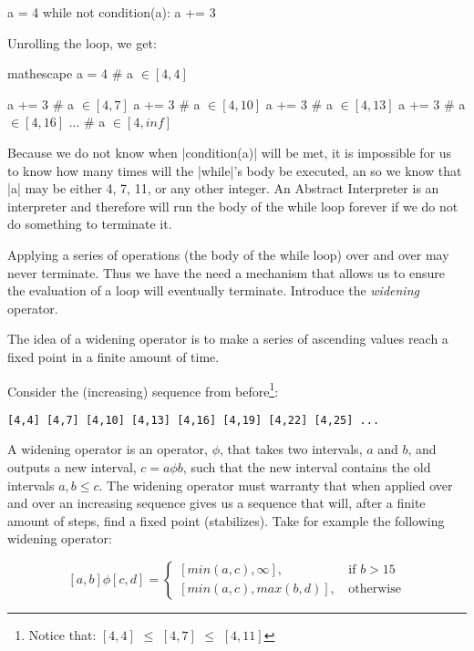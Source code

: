 \begin{pythoncode}
a = 4
while not condition(a):
  a += 3
\end{pythoncode}

Unrolling the loop, we get:

\begin{pythoncode*}{mathescape}
a = 4     # a $\in [4,4]$

  a += 3  # a $\in [4,7]$
  a += 3  # a $\in [4,10]$
  a += 3  # a $\in [4,13]$
  a += 3  # a $\in [4,16]$
  ...
  # a $\in [4, inf]$
\end{pythoncode*}

Because we do not know when \pycode|condition(a)| will be met, it is
impossible for us to know how many times will the \pycode|while|'s body
be executed, an so we know that \pycode|a| may be either 4, 7, 11, or
any other integer. An Abstract Interpreter is an interpreter and
therefore will run the body of the while loop forever if we do not do
something to terminate it.

Applying a series of operations (the body of the while loop) over and
over may never terminate. Thus we have the need a mechanism that allows
us to ensure the evaluation of a loop will eventually terminate.
Introduce the \emph{widening} operator.

The idea of a widening operator is to make a series of ascending values
reach a fixed point in a finite amount of time.

Consider the (increasing) sequence from before\footnote{Notice that:
$[4,4]$ \(\le\) $[4,7]$ \(\le\) $[4,11]$}:

\begin{verbatim}
[4,4] [4,7] [4,10] [4,13] [4,16] [4,19] [4,22] [4,25] ...
\end{verbatim}

A widening operator is an operator, \(\phi{}\), that takes two
intervals, \(a\) and \(b\), and outputs a new interval,
\(c = a \phi b\), such that the new interval contains the old intervals
\(a, b \le c\). The widening operator must warranty that when applied
over and over an increasing sequence gives us a sequence that will,
after a finite amount of steps, find a fixed point (stabilizes). Take
for example the following widening operator:

\[[a, b] \phi [c, d] =
     \begin{cases}
       [min(a,c), \infty]\text{, } & \text{if } b > 15 \\
       [min(a,c), max(b,d)]\text{, } & \text{otherwise}
     \end{cases}\]

